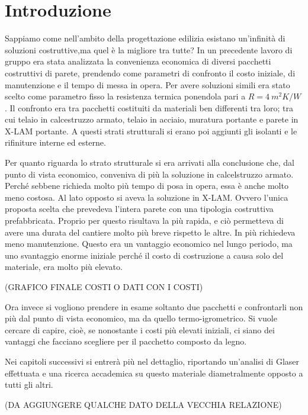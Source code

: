 \chapter{Introduzione}
Sappiamo come nell'ambito della progettazione edilizia esistano un'infinità di soluzioni costruttive,ma quel è la migliore tra tutte? 
In un precedente lavoro di gruppo era stata analizzata la convenienza economica di diversi pacchetti costruttivi di parete, prendendo come parametri di confronto il costo iniziale, di manutenzione e il tempo di messa in opera. 
Per avere soluzioni simili era stato scelto come parametro fisso la resistenza termica ponendola pari a $R=\SI{4}{m^2K\per W}$.
Il confronto era tra pacchetti costituiti da materiali ben differenti tra loro; tra cui telaio in calcestruzzo armato, telaio in acciaio, muratura portante e parete in X-LAM portante.
A questi strati strutturali si erano poi aggiunti gli isolanti e le rifiniture interne ed esterne.

Per quanto riguarda lo strato strutturale si era arrivati alla conclusione che, dal punto di vista economico, conveniva di più la soluzione in calcelstruzzo armato. 
Perché sebbene richieda molto più tempo di posa in opera, essa è anche molto meno costosa. 
Al lato opposto si aveva la soluzione in X-LAM. 
Ovvero l'unica proposta scelta che prevedeva l'intera parete con una tipologia costruttiva prefabbricata.
Proprio per questo risultava la più rapida, e ciò permetteva di avere una durata del cantiere molto più breve rispetto le altre. 
In più richiedeva meno manutenzione.
Questo era un vantaggio economico nel lungo periodo, ma uno svantaggio enorme iniziale perché il costo di costruzione a causa solo del materiale, era molto più elevato.

(GRAFICO FINALE COSTI O DATI CON I COSTI)

Ora invece si vogliono prendere in esame soltanto due pacchetti e confrontarli non più dal punto di vista economico, ma da quello termo-igrometrico.
Si vuole cercare di capire, cioè, se nonostante i costi più elevati iniziali, ci siano dei vantaggi che facciano scegliere per il pacchetto composto da legno.

Nei capitoli successivi si entrerà più nel dettaglio, riportando un'analisi di Glaser effettuata e una ricerca accademica su questo materiale diametralmente opposto a tutti gli altri.

(DA AGGIUNGERE QUALCHE DATO DELLA VECCHIA RELAZIONE)